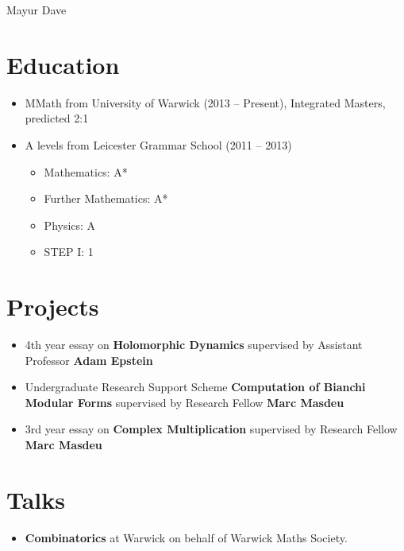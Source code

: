 \documentclass[letterpaper]{article}
\def\name{Mayur Dave}
\begin{document}
	
	{\huge \name}
	
	\vspace{0.25in}
	

	\section*{Education}
	
	\begin{itemize}
		\item MMath from University of Warwick (2013 -- Present), Integrated Masters, predicted 2:1
		
		\item A levels from Leicester Grammar School (2011 -- 2013)
		\begin{itemize}
			\item Mathematics: A*
			\item Further Mathematics:  A*
			\item Physics:  A
			\item STEP I:  1
		\end{itemize}
	\end{itemize}
	
	
	\section*{Projects}
	
	\begin{itemize}
		\item 4th year essay on \textbf{Holomorphic Dynamics} supervised by Assistant Professor \textbf{Adam Epstein}
		\item Undergraduate Research Support Scheme \textbf{Computation of Bianchi Modular Forms} supervised by Research Fellow \textbf{Marc Masdeu}
		\item 3rd year essay on \textbf{Complex Multiplication} supervised by Research Fellow \textbf{Marc Masdeu}
		
	\end{itemize}
	
	\section*{Talks}
	\begin{itemize}
		\item \textbf{Combinatorics} at Warwick on behalf of Warwick Maths Society.
	\end{itemize}
	
\end{document}
